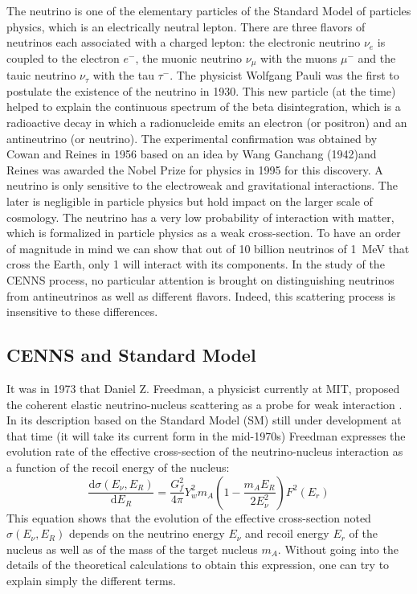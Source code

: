 The neutrino is one of the elementary particles of the Standard Model of particles physics, which is an electrically neutral lepton. There are three flavors of neutrinos each associated with a charged lepton: the electronic neutrino $\nu_e$ is coupled to the electron $e^-$, the muonic neutrino $\nu_{\mu}$ with the muons $\mu^-$ and the tauic neutrino $\nu_{\tau}$ with the tau $\tau^-$.
The physicist Wolfgang Pauli was the first to postulate the existence of the neutrino in 1930. This new particle (at the time) helped to explain the continuous spectrum of the beta disintegration, which is a radioactive decay in which a radionucleide emits an electron (or positron) and an antineutrino (or neutrino).
The experimental confirmation was obtained by Cowan and Reines in 1956 based on an idea by Wang Ganchang (1942)and Reines was awarded the Nobel Prize for physics in 1995 for this discovery.
A neutrino is only sensitive to the electroweak and gravitational interactions. The later is negligible in particle physics but hold impact on the larger scale of cosmology. 
The neutrino has a very low probability of interaction with matter, which is formalized in particle physics as a weak cross-section. To have an order of magnitude in mind we can show that out of 10 billion neutrinos of \SI{1}{\mega\eV} that cross the Earth, only 1 will interact with its components.
In the study of the CENNS process, no particular attention is brought on distinguishing  neutrinos from antineutrinos as well as different flavors. Indeed, this scattering process is insensitive to these differences. 


\subsection{CENNS and Standard Model}

It was in 1973 that Daniel Z. Freedman, a physicist currently at MIT, proposed the coherent elastic neutrino-nucleus scattering as a probe for weak interaction \cite{Freedman:1973yd}.
 In its description based on the Standard Model (SM)  still under development at that time (it will take its current form in the mid-1970s) Freedman expresses the evolution rate of the effective cross-section of the neutrino-nucleus interaction as a function of the recoil energy of the nucleus:
\begin{equation}
\label{eq:cenns-equation}
\frac{\mathrm{d} \sigma (E_{\nu}, E_R)}{\mathrm{d} E_R}
=
\frac{G_{f}^2}{4\pi}
Y_w^2  m_A
\left( 1 - \frac{m_A E_R}{2 E_{\nu}^2} \right)
F^2(E_r)
\end{equation}
This equation shows that the evolution of the effective cross-section noted $\sigma(E_{\nu} , {E_R} )$ depends on the neutrino energy $E_{\nu}$ and recoil energy $E_r$ of the nucleus as well as of the mass of the target nucleus $m_A$. Without going into the details of the theoretical calculations to obtain this expression, one can try to explain simply the different terms.

